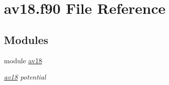 \hypertarget{av18_8f90}{}\section{av18.\+f90 File Reference}
\label{av18_8f90}
\subsection*{Modules}
\begin{DoxyCompactItemize}
\item 
module \hyperlink{namespaceav18}{av18}
\begin{DoxyCompactList}\small\item\em \hyperlink{namespaceav18}{av18} potential \end{DoxyCompactList}\end{DoxyCompactItemize}
